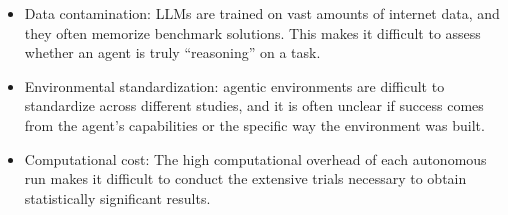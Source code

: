 \documentclass{fairmeta}
\begin{document}
\begin{itemize}
    \item Data contamination: LLMs are trained on vast amounts of internet data, and they often memorize benchmark solutions. This makes it difficult to assess whether an agent is truly ``reasoning'' on a task.

    \item Environmental standardization: agentic environments are difficult to standardize across different studies, and it is often unclear if success comes from the agent's capabilities or the specific way the environment was built.

    \item  Computational cost: The high computational overhead of each autonomous run makes it difficult to conduct the extensive trials necessary to obtain statistically significant results.

\end{itemize}
\end{document}
